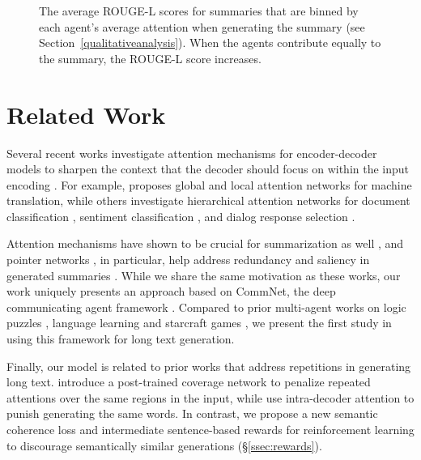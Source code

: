\documentclass[11pt,a4paper]{article}
\begin{document}
\begin{figure}[t]
\begin{center} 
\end{center} 
\vskip -0.18in
\caption{The average ROUGE-L scores for summaries that are binned by each agent's average attention when generating the summary (see Section~\ref{qualitativeanalysis}). When the agents contribute equally to the summary, the ROUGE-L score increases.} \label{agentattentiondetail}
\end{figure}


 \section{Related Work} 
\label{sec:model}


Several recent works investigate attention mechanisms for encoder-decoder models to sharpen the context that the decoder should focus on within the input encoding \cite{att1,att2,bahdanau2014neural}. For example, \citet{att1} proposes {global} and {local} attention networks for machine translation, while others investigate hierarchical attention networks for document classification \cite{att3}, sentiment classification \cite{att4}, and dialog response selection \cite{att5}.

Attention mechanisms have shown to be crucial for summarization as well \cite{deepsummrush,efficientsum,summs2s}, and pointer networks \cite{pointer}, in particular, help address redundancy and saliency in generated summaries \cite{Lapata,summpoinernet,rlsummsocher,controllable}. While we share the same motivation as these works, 
our work uniquely presents an approach based on CommNet, the deep communicating agent framework \cite{commnet}.
Compared to prior multi-agent works on logic puzzles \cite{multiagent1}, language learning \cite{multiagent2,multiagent3} and starcraft games \cite{starcraft}, 
we present the first study in using this framework for long text generation. 

Finally, our model is related to prior works that address repetitions in generating long text.  
\citet{summpoinernet} introduce a post-trained coverage network 
to penalize repeated attentions over the same regions in the input, 
while
\citet{rlsummsocher} use intra-decoder attention to punish generating the same words.
In contrast, we propose a new semantic coherence loss and intermediate sentence-based rewards for reinforcement learning  
to discourage semantically similar generations (\S\ref{ssec:rewards}).
\end{document}
